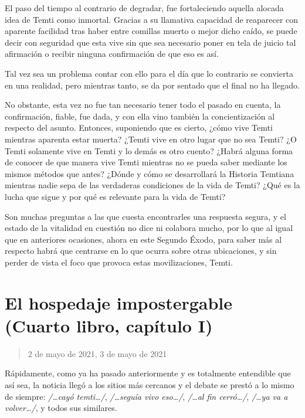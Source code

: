 \documentclass[
]{book}
\begin{document}
El paso del tiempo al contrario de degradar, fue fortaleciendo aquella alocada idea de Temti como inmortal. Gracias a su llamativa capacidad de reaparecer con aparente facilidad tras haber entre comillas muerto o mejor dicho caído, se puede decir con seguridad que esta vive sin que sea necesario poner en tela de juicio tal afirmación o recibir ninguna confirmación de que eso es así.

Tal vez sea un problema contar con ello para el día que lo contrario se convierta en una realidad, pero mientras tanto, se da por sentado que el final no ha llegado.

No obstante, esta vez no fue tan necesario tener todo el pasado en cuenta, la confirmación, fiable, fue dada, y con ella vino también la concientización al respecto del asunto. Entonces, suponiendo que es cierto, ¿cómo vive Temti mientras aparenta estar muerta? ¿Temti vive en otro lugar que no sea Temti? ¿O Temti solamente vive en Temti y lo demás es otro cuento? ¿Habrá alguna forma de conocer de que manera vive Temti mientras no se pueda saber mediante los mismos métodos que antes? ¿Dónde y cómo se desarrollará la Historia Temtiana mientras nadie sepa de las verdaderas condiciones de la vida de Temti? ¿Qué es la lucha que sigue y por qué es relevante para la vida de Temti?

Son muchas preguntas a las que cuesta encontrarles una respuesta segura, y el estado de la vitalidad en cuestión no dice ni colabora mucho, por lo que al igual que en anteriores ocasiones, ahora en este Segundo Éxodo, para saber más al respecto habrá que centrarse en lo que ocurra sobre otras ubicaciones, y sin perder de vista el foco que provoca estas movilizaciones, Temti.

\hypertarget{el-hospedaje-impostergable-cuarto-libro-capuxedtulo-i}{%
\section{El hospedaje impostergable (Cuarto libro, capítulo I)}\label{el-hospedaje-impostergable-cuarto-libro-capuxedtulo-i}}

\begin{quote}
2 de mayo de 2021, 3 de mayo de 2021
\end{quote}

Rápidamente, como ya ha pasado anteriormente y es totalmente entendible que así sea, la noticia llegó a los sitios más cercanos y el debate se prestó a lo mismo de siempre: \emph{/\ldots cayó temti\ldots/}, \emph{/\ldots seguía vivo eso\ldots/}, \emph{/\ldots al fin cerró\ldots/}, \emph{/\ldots ya va a volver\ldots/}, y todos sus similares.
\end{document}

